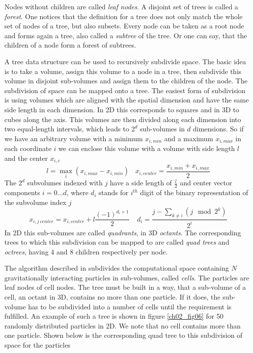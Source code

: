 Nodes without children are called \emph{leaf nodes}. A disjoint set of trees is called a \emph{forest}. One notices that the definition for a tree does not only match the whole set of nodes of a tree, but also subsets. Every node can be taken as a root node and forms again a tree, also called a \emph{subtree} of the tree. Or one can say, that the children of a node form a forest of subtrees.

A tree data structure can be used to recursively subdivide space. The basic idea is to take a volume, assign this volume to a node in a tree, then subdivide this volume in disjoint sub-volumes and assign them to the children of the node. The subdivision of space can be mapped onto a tree. The easiest form of subdivision is using volumes which are aligned with the spatial dimension and have the same side length in each dimension. In 2D this corresponds to squares and in 3D to cubes along the axis. This volumes are then divided along each dimension into two equal-length intervals, which leads to $2^d$ sub-volumes in $d$ dimensions. So if we have an arbitrary volume with a minimum $x_{i,min}$ and a maximum $x_{i,max}$ in each coordinate $i$ we can enclose this volume with a volume with side length $l$ and the center $x_{i,c}$
\begin{equation}
\label{ch02_grav02_eq012}
l = \max_{i} ( x_{i,max} - x_{i,min})  ~~~~ x_{i,center}= \frac{ x_{i,min} + x_{i,max} }{2}
\end{equation}
The $2^{d}$ subvolumes indexed with $j$ have a side length of $\frac{l}{2}$ and center vector components $i = 0 \dots d$, where $d_{i}$ stands for $i^{th}$ digit of the binary representation of the subvolume index $j$
\begin{equation}
\label{ch02_grav02_eq013}
x_{i, j~center} = x_{i,center} + l \frac{(-1)^{d_{i} + 1}}{2} ~~~~~ d_{i} = \frac{j  - \sum_{k \ne i} ( j \mod 2^{k} )}{2^{i}}
\end{equation}
In 2D this sub-volumes are called \emph{quadrants}, in 3D \emph{octants}. The corresponding trees to which this subdivision can be mapped to are called \emph{quad trees} and \emph{octrees}, having 4 and 8 children respectively per node.

The algorithm described in \cite{Barnes:1986p2853} subdivides the computational space containing $N$ gravitationally interacting particles in sub-volumes, called \emph{cells}. The particles are leaf nodes of cell nodes. The tree must be built in a way, that a sub-volume of a cell, an octant in 3D, contains no more than one particle. If it does, the sub-volume has to be subdivided into a number of cells until the requirement is fulfilled. An example of such a tree is shown in figure \ref{ch02_fig06} for 50 randomly distributed particles in 2D. We note that no cell contains more than one particle. Shown below is the corresponding quad tree to this subdivision of space for the particles


